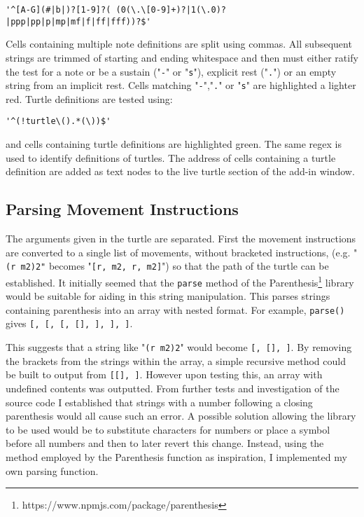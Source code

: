 \begin{verbatim}
'^[A-G](#|b|)?[1-9]?( (0(\.\[0-9]+)?|1(\.0)?|ppp|pp|p|mp|mf|f|ff|fff))?$'
\end{verbatim}


Cells containing multiple note definitions are split using commas. All subsequent strings are trimmed of starting and ending whitespace and then must either ratify the test for a note or be a sustain ("\texttt{-}" or "\texttt{s}"), explicit rest ("\texttt{.}") or an empty string from an implicit rest. Cells matching "\texttt{-}","\texttt{.}" or "\texttt{s}" are highlighted a lighter red. Turtle definitions are tested using:

\begin{verbatim}
'^(!turtle\().*(\))$'
\end{verbatim}

and cells containing turtle definitions are highlighted green. The same regex is used to identify definitions of turtles. The address of cells containing a turtle definition are added as text nodes to the live turtle section of the add-in window.

\subsection{Parsing Movement Instructions}

The arguments given in the turtle are separated. First the movement instructions are converted to a single list of movements, without bracketed instructions, (e.g. "\texttt{(r m2)2"} becomes "\texttt{[r, m2, r, m2]}") so that the path of the turtle can be established. It initially seemed that the \texttt{parse} method of the Parenthesis\footnote{https://www.npmjs.com/package/parenthesis} library would be suitable for aiding in this string manipulation. This parses strings containing parenthesis into an array with nested format. For example, \texttt{parse()} gives \texttt{[, [\upquote{b[}, [, [], \upquote{\}}], \upquote{]}], \upquote{)}]}.

This suggests that a string like "\texttt{(r m2)2}" would become \texttt{[\upquote{(}, [], ]}.  By removing the brackets from the strings within the array, a simple recursive method could be built to output \texttt{} from \texttt{[[], ]}. However upon testing this, an array with undefined contents was outputted. From further tests and investigation of the source code I established that strings with a number following a closing parenthesis would all cause such an error. A possible solution allowing the library to be used would be to substitute characters for numbers or place a symbol before all numbers and then to later revert this change. Instead, using the method employed by the Parenthesis function as inspiration, I implemented my own parsing function.

